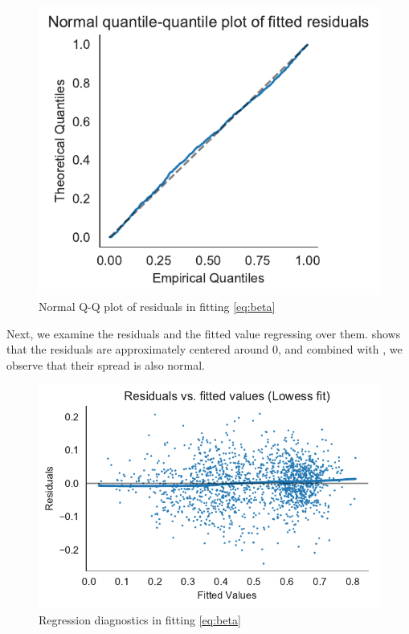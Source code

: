 \documentclass[11pt]{article}
\begin{document}
\begin{figure}[tbh]
  \centering
  \includegraphics{qq.pdf}
  \caption{Normal Q-Q plot of residuals in fitting \eqref{eq:beta}}
  \label{fig:qq}
\end{figure}

Next, we examine the residuals and the fitted value regressing over them.  shows that the residuals are approximately centered around 0, and combined with , we observe that their spread is also normal.

\begin{figure}[tbh]
  \centering
  \includegraphics{diagnostics.pdf}
  \caption{Regression diagnostics in fitting \eqref{eq:beta}}
  \label{fig:diag}
\end{figure}
\end{document}
